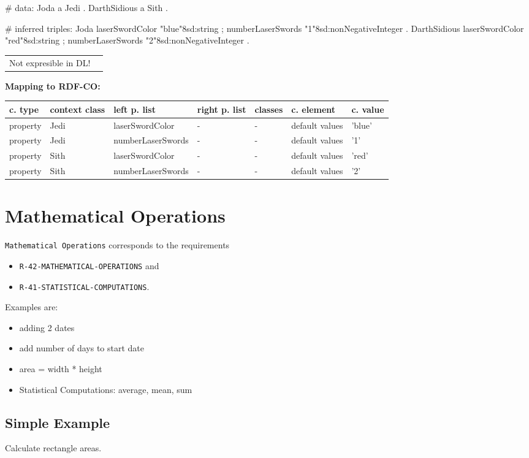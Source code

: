 \documentclass{llncs}
\newcommand{\ms}[1]{\texttt{#1}}
\newenvironment{gcotable}{
  \scriptsize
  \sffamily
  \vspace{0cm}
	\begin{center}
	\textbf{\vspace{0.4cm}Mapping to RDF-CO:} \\
  \begin{tabular}{l|l|l|l|l|l|l}
	\hline
  \textbf{c. type} & \textbf{context class} & \textbf{left p. list} & \textbf{right p. list} & \textbf{classes} & \textbf{c. element} & \textbf{c. value} \\
  \hline

}{
  \hline
  \end{tabular}
	\end{center}
}
\newenvironment{DL}{
  \vspace{0cm}
	\begin{center}
  \begin{tabular}{r l}

}{
  \end{tabular}
	\end{center}
}
\begin{document}
\begin{ex}
# data:
Joda a Jedi .
DarthSidious a Sith .
\end{ex}

\begin{ex}
# inferred triples:
Joda 
    laserSwordColor "blue"^^xsd:string ;
    numberLaserSwords "1"^^xsd:nonNegativeInteger .
DarthSidious 
    laserSwordColor "red"^^xsd:string ;
    numberLaserSwords "2"^^xsd:nonNegativeInteger .
\end{ex}

\begin{DL}
Not expresible in DL!
\end{DL}

\begin{gcotable}
property & Jedi & laserSwordColor & - & - & default values & 'blue' \\
property & Jedi & numberLaserSwords & - & - & default values & '1' \\
property & Sith & laserSwordColor & - & - & default values & 'red' \\
property & Sith & numberLaserSwords & - & - & default values & '2' \\
\end{gcotable}

\section{Mathematical Operations}

\ms{Mathematical Operations} corresponds to the requirements
\begin{itemize}
	\item \ms{R-42-MATHEMATICAL-OPERATIONS} and
  \item \ms{R-41-STATISTICAL-COMPUTATIONS}.
\end{itemize}
Examples are:
\begin{itemize}
	\item adding 2 dates
	\item add number of days to start date
	\item area = width * height
	\item Statistical Computations: average, mean, sum
\end{itemize}

\subsection{Simple Example}

Calculate rectangle areas.
\end{document}

